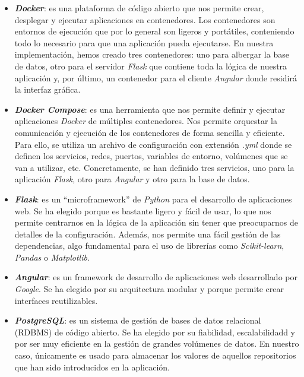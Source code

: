 \begin{itemize}
    \item \textbf{\textit{Docker}}: es una plataforma de código abierto que nos permite crear, desplegar
    y ejecutar aplicaciones en contenedores. Los contenedores son entornos de ejecución que por
    lo general son ligeros y portátiles, conteniendo todo lo necesario para que una aplicación
    pueda ejecutarse. En nuestra implementación, hemos creado tres contenedores: uno para albergar
    la base de datos, otro para el servidor \textit{Flask} que contiene toda la lógica de nuestra
    aplicación y, por último, un contenedor para el cliente \textit{Angular} donde residirá la
    interfaz gráfica.\\

    \item \textbf{\textit{Docker Compose}}: es una herramienta que nos permite definir y ejecutar
    aplicaciones \textit{Docker} de múltiples contenedores. Nos permite orquestar la comunicación
    y ejecución de los contenedores de forma sencilla y eficiente. Para ello, se utiliza un archivo
    de configuración con extensión \textit{.yml} donde se definen los servicios, redes, puertos,
    variables de entorno, volúmenes que se van a utilizar, etc. Concretamente, se han definido
    tres servicios, uno para la aplicación \textit{Flask}, otro para \textit{Angular} y otro para
    la base de datos.\\

    \item \textbf{\textit{Flask}}: es un ``microframework'' de \textit{Python} para el desarrollo
    de aplicaciones web. Se ha elegido porque es bastante ligero y fácil de usar, lo que nos
    permite centrarnos en la lógica de la aplicación sin tener que preocuparnos de detalles de la
    configuración. Además, nos permite una fácil gestión de las dependencias, algo fundamental
    para el uso de librerías como \textit{Scikit-learn}, \textit{Pandas} o \textit{Matplotlib}.\\

    \item \textbf{\textit{Angular}}: es un framework de desarrollo de aplicaciones web desarrollado
    por \textit{Google}. Se ha elegido por su arquitectura modular y porque permite crear
    interfaces reutilizables.\\

    \item \textbf{\textit{PostgreSQL}}: es un sistema de gestión de bases de datos relacional
    (RDBMS) de código abierto. Se ha elegido por su fiabilidad, escalabilidadd y por ser muy
    eficiente en la gestión de grandes volúmenes de datos. En nuestro caso, únicamente es
    usado para almacenar los valores de aquellos repositorios que han sido introducidos en la
    aplicación.\\
\end{itemize}

